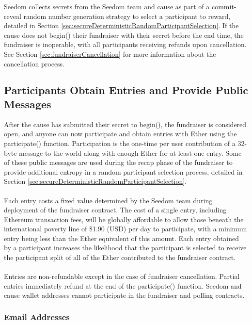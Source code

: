 \documentclass[11pt]{article}
\begin{document}
Seedom collects secrets from the Seedom team and cause as part of a commit-reveal random number generation strategy to select a participant to reward, detailed in Section \ref{sec:secureDeterministicRandomParticipantSelection}. If the cause does not begin() their fundraiser with their secret before the end time, the fundraiser is inoperable, with all participants receiving refunds upon cancellation. See Section \ref{sec:fundraiserCancellation} for more information about the cancellation process.

\subsection{Participants Obtain Entries and Provide Public Messages}

After the cause has submitted their secret to begin(), the fundraiser is considered open, and anyone can now participate and obtain entries with Ether using the participate() function. Participation is the one-time per user contribution of a 32-byte message to the world along with enough Ether for at least one entry. Some of these public messages are used during the recap phase of the fundraiser to provide additional entropy in a random participant selection process, detailed in Section \ref{sec:secureDeterministicRandomParticipantSelection}.\\\\
Each entry costs a fixed value determined by the Seedom team during deployment of the fundraiser contract. The cost of a single entry, including Ethereum transaction fees, will be globally affordable to allow those beneath the international poverty line of \$1.90 (USD) per day \cite{1} to participate, with a minimum entry being less than the Ether equivalent of this amount. Each entry obtained by a participant increases the likelihood that the participant is selected to receive the participant split of all of the Ether contributed to the fundraiser contract.\\\\
Entries are non-refundable except in the case of fundraiser cancellation. Partial entries immediately refund at the end of the participate() function. Seedom and cause wallet addresses cannot participate in the fundraiser and polling contracts.

\subsubsection{Email Addresses}
\end{document}
